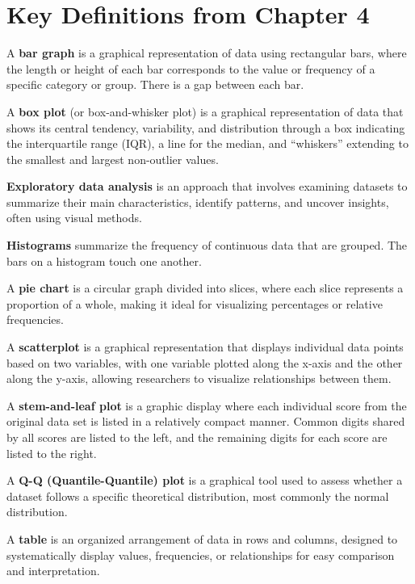 \documentclass[
  letterpaper,
  DIV=11,
  numbers=noendperiod]{scrreprt}
\begin{document}
\section*{Key Definitions from Chapter
4}\label{key-definitions-from-chapter-4}


A \textbf{bar graph} is a graphical representation of data using
rectangular bars, where the length or height of each bar corresponds to
the value or frequency of a specific category or group. There is a gap
between each bar.

A \textbf{box plot} (or box-and-whisker plot) is a graphical
representation of data that shows its central tendency, variability, and
distribution through a box indicating the interquartile range (IQR), a
line for the median, and ``whiskers'' extending to the smallest and
largest non-outlier values.

\textbf{Exploratory data analysis} is an approach that involves
examining datasets to summarize their main characteristics, identify
patterns, and uncover insights, often using visual methods.

\textbf{Histograms} summarize the frequency of continuous data that are
grouped. The bars on a histogram touch one another.

A \textbf{pie chart} is a circular graph divided into slices, where each
slice represents a proportion of a whole, making it ideal for
visualizing percentages or relative frequencies.

A \textbf{scatterplot} is a graphical representation that displays
individual data points based on two variables, with one variable plotted
along the x-axis and the other along the y-axis, allowing researchers to
visualize relationships between them.

A \textbf{stem-and-leaf plot} is a graphic display where each individual
score from the original data set is listed in a relatively compact
manner. Common digits shared by all scores are listed to the left, and
the remaining digits for each score are listed to the right.

A \textbf{Q-Q (Quantile-Quantile) plot} is a graphical tool used to
assess whether a dataset follows a specific theoretical distribution,
most commonly the normal distribution.

A \textbf{table} is an organized arrangement of data in rows and
columns, designed to systematically display values, frequencies, or
relationships for easy comparison and interpretation.
\end{document}

